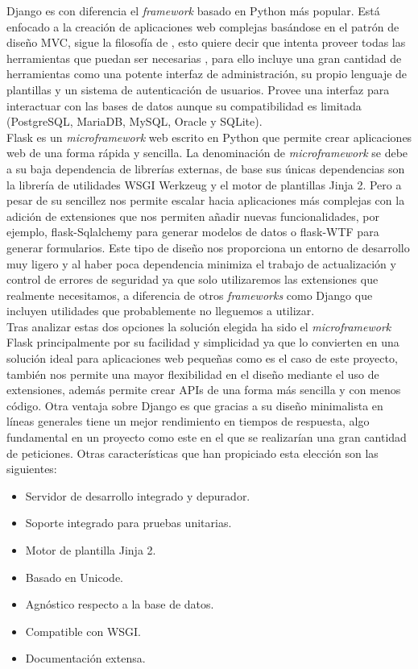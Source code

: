 \documentclass[../proyecto.tex]{subfiles}
\begin{document}
Django es con diferencia el \textit{framework} basado en Python más popular. Está enfocado a la creación de aplicaciones web complejas basándose en el patrón de diseño MVC, sigue la filosofía de , esto quiere decir que intenta proveer todas las herramientas que puedan ser necesarias , para ello incluye una gran cantidad de herramientas como una potente interfaz de administración, su propio lenguaje de plantillas y un sistema de autenticación de usuarios. Provee una interfaz para interactuar con las bases de datos aunque su compatibilidad es limitada (PostgreSQL, MariaDB, MySQL, Oracle y SQLite).\\

Flask es un \textit{microframework} web escrito en Python que permite crear aplicaciones web de una forma rápida y sencilla. La denominación de \textit{microframework} se debe a su baja dependencia de librerías externas, de base sus únicas dependencias son la librería de utilidades WSGI Werkzeug y el motor de plantillas Jinja 2. Pero a pesar de su sencillez nos permite escalar hacia aplicaciones más complejas con la adición de extensiones que nos permiten añadir nuevas funcionalidades, por ejemplo, flask-Sqlalchemy para generar modelos de datos o flask-WTF para generar formularios. Este tipo de diseño nos proporciona un entorno de desarrollo muy ligero y al haber poca dependencia minimiza el trabajo de actualización y control de errores de seguridad ya que solo utilizaremos las extensiones que realmente necesitamos, a diferencia de otros \textit{frameworks} como Django que incluyen utilidades que probablemente no lleguemos a utilizar.\\

Tras analizar estas dos opciones la solución elegida ha sido el \textit{microframework} Flask principalmente por su facilidad y simplicidad ya que lo convierten en una solución ideal para aplicaciones web pequeñas como es el caso de este proyecto, también nos permite una mayor flexibilidad en el diseño mediante el uso de extensiones, además permite crear APIs de una forma más sencilla y con menos código. Otra ventaja sobre Django es que gracias a su diseño minimalista en líneas generales tiene un mejor rendimiento en tiempos de respuesta, algo fundamental en un proyecto como este en el que se realizarían una gran cantidad de peticiones. Otras características que han propiciado esta elección son las siguientes:

\begin{itemize}
  \item Servidor de desarrollo integrado y depurador.
  \item Soporte integrado para pruebas unitarias.
  \item Motor de plantilla Jinja 2.
  \item Basado en Unicode.
  \item Agnóstico respecto a la base de datos.
  \item Compatible con WSGI.
  \item Documentación extensa.
\end{itemize}
\end{document}
